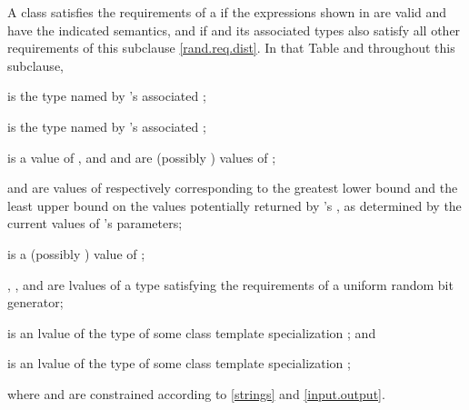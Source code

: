 \pnum
A class 
satisfies the requirements
of a 
if the expressions shown
in 
are valid and have the indicated semantics,
and if  and its associated types
also satisfy all other requirements
of this subclause \ref{rand.req.dist}.
In that Table and throughout this subclause,
\begin{enumeratea}
  \item
     is the type named by
    's associated ;
  \item
     is the type named by
    's associated ;
  \item
     is a
    value of ,
    and
     and  are (possibly ) values of ;
  \item
     and 
    are values of 
    respectively corresponding to
    the greatest lower bound and the least upper bound
    on the values potentially returned by 's ,
    as determined by the current values of 's parameters;
  \item
     is a (possibly ) value of ;
  \item
    , , and  are lvalues of a type
    satisfying the requirements
    of a uniform random bit generator;
  \item
     is an lvalue of the type of some class template specialization
     ;
  and
  \item
     is an lvalue of the type of some class template specialization
     ;
\end{enumeratea}
where  and  are constrained
according to \ref{strings} and \ref{input.output}.

